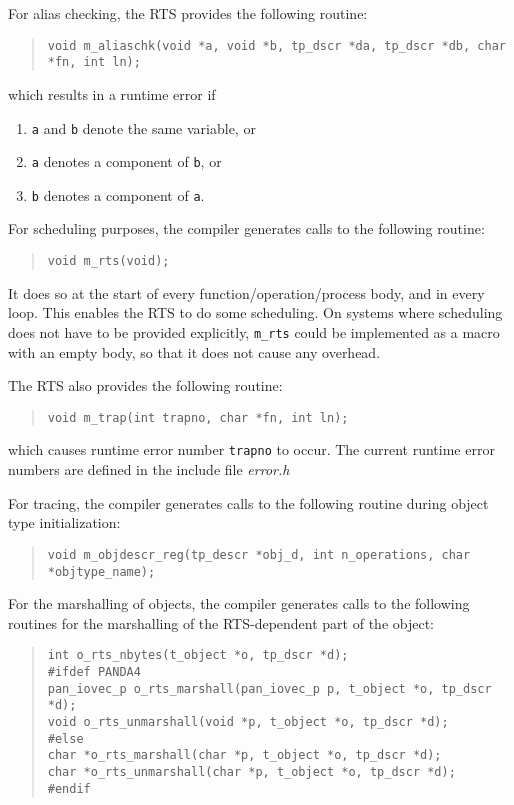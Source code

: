 \documentclass[10pt]{article}
\begin{document}
For alias checking, the RTS provides the following routine:
\begin{quote}
\begin{verbatim}
void m_aliaschk(void *a, void *b, tp_dscr *da, tp_dscr *db, char *fn, int ln);
\end{verbatim}
\end{quote}
which results in a runtime error if
\begin{enumerate}
\item
\verb+a+ and \verb+b+ denote the same variable, or
\item
\verb+a+
denotes a component of \verb+b+, or
\item
\verb+b+ denotes a component of \verb+a+.
\end{enumerate}
For scheduling purposes, the compiler generates calls to the following routine:
\begin{quote}
\begin{verbatim}
void m_rts(void);
\end{verbatim}
\end{quote}
It does so at the start of every function/operation/process body,
and in every loop. 
This enables the RTS to do some scheduling.
On systems where scheduling does not have to be provided explicitly,
\verb+m_rts+
could be implemented as a macro with an empty body,
so that it does not cause any overhead.

The RTS also provides the following routine:
\begin{quote}
\begin{verbatim}
void m_trap(int trapno, char *fn, int ln);
\end{verbatim}
\end{quote}
which causes runtime error number \verb+trapno+
to occur.
The current runtime error numbers are defined in the include file
{\em error.h}

For tracing,
the compiler generates calls to the following routine during object type
initialization:
\begin{quote}
\begin{verbatim}
void m_objdescr_reg(tp_descr *obj_d, int n_operations, char *objtype_name);
\end{verbatim}
\end{quote}

For the marshalling of objects, the compiler generates calls to the following
routines for the marshalling of the RTS-dependent part of the object:
\begin{quote}
\begin{verbatim}
int o_rts_nbytes(t_object *o, tp_dscr *d);
#ifdef PANDA4
pan_iovec_p o_rts_marshall(pan_iovec_p p, t_object *o, tp_dscr *d);
void o_rts_unmarshall(void *p, t_object *o, tp_dscr *d);
#else
char *o_rts_marshall(char *p, t_object *o, tp_dscr *d);
char *o_rts_unmarshall(char *p, t_object *o, tp_dscr *d);
#endif
\end{verbatim}
\end{quote}
\end{document}

